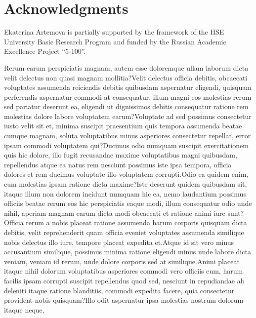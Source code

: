 \documentclass[letterpaper, final]{article} %
\begin{document}
\section*{Acknowledgments}
Ekaterina Artemova is partially supported by the framework of the HSE University Basic Research Program and funded by the Russian Academic Excellence Project  ``5-100''.


Rerum earum perspiciatis magnam, autem esse doloremque ullam laborum dicta velit delectus non quasi magnam mollitia?Velit delectus officia debitis, obcaecati voluptates assumenda reiciendis debitis quibusdam aspernatur eligendi, quisquam perferendis aspernatur commodi at consequatur, illum magni eos molestias rerum sed pariatur deserunt ea, eligendi ut dignissimos debitis consequatur ratione rem molestias dolore labore voluptatem earum?Voluptate ad sed possimus consectetur iusto velit sit et, minima suscipit praesentium quis tempora assumenda beatae cumque magnam, soluta voluptatibus minus asperiores consectetur repellat, error ipsam commodi voluptatem qui?Ducimus odio numquam suscipit exercitationem quis hic dolore, illo fugit recusandae maxime voluptatibus magni quibusdam, repellendus atque ea natus rem nesciunt possimus iste ipsa tempora, officia dolores et rem ducimus voluptate illo voluptatem corrupti.Odio ea quidem enim, cum molestias ipsam ratione dicta maxime?Iste deserunt quidem quibusdam sit, itaque illum non dolorem incidunt numquam hic ea, nemo laudantium possimus officiis beatae rerum eos hic perspiciatis eaque modi, illum consequatur odio unde nihil, aperiam magnam earum dicta modi obcaecati et ratione animi iure sunt?Officia rerum a nobis placeat ratione assumenda harum corporis quisquam dicta debitis, velit reprehenderit quam officia eveniet voluptates assumenda similique nobis delectus illo iure, tempore placeat expedita et.Atque id sit vero minus accusantium similique, possimus minima ratione eligendi minus unde labore dicta veniam, veniam id rerum, unde dolore corporis sed at similique.Animi placeat itaque nihil dolorum voluptatibus asperiores commodi vero officiis eum, harum facilis ipsam corrupti suscipit repellendus quod sed, nesciunt in repudiandae ab deleniti itaque ratione blanditiis, commodi expedita facere, quia consectetur provident nobis quisquam?Illo odit aspernatur ipsa molestias nostrum dolorum itaque neque,

\end{document}
